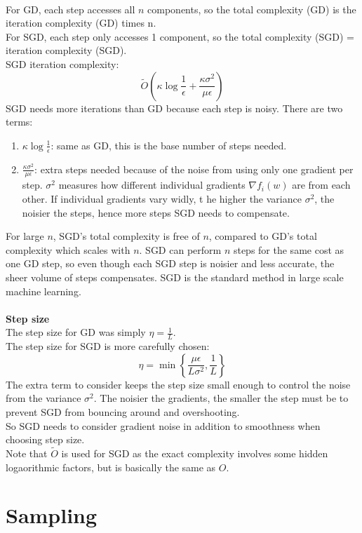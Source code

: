 \documentclass[../Probability.tex]{subfiles}
\begin{document}
\\
For GD, each step accesses all $n$ components, so the total complexity (GD) is the iteration complexity (GD) times n.\\
For SGD, each step only accesses 1 component, so the total complexity (SGD) = iteration complexity (SGD).\\
SGD iteration complexity:
$$\tilde{O}\left(\kappa\log\frac{1}{\epsilon} + \frac{\kappa\sigma^2}{\mu\epsilon}\right)$$
SGD needs more iterations than GD because each step is noisy. There are two terms:
\begin{enumerate}
    \item $\kappa \log \frac{1}{\epsilon}$: same as GD, this is the base number of steps needed.
    \item $\frac{\kappa \sigma^2}{\mu \epsilon}$: extra steps needed because of the noise from using only one gradient per step.
    $\sigma^2$ measures how different individual gradients $\nabla f_i(w)$ are from each other.
    If individual gradients vary widly, t   he higher the variance $\sigma^2$, the noisier the steps, hence more steps SGD needs to compensate.
\end{enumerate}
For large $n$, SGD's total complexity is free of $n$, compared to GD's total complexity which scales with $n$.
SGD can perform $n$ steps for the same cost as one GD step, so even though each SGD step is noisier and less accurate, the sheer volume of steps compensates.
SGD is the standard method in large scale machine learning.\\
\\
\textbf{Step size}\\
The step size for GD was simply $\eta = \frac{1}{L}$.\\
The step size for SGD is more carefully chosen:
$$\eta = \min\left\{\frac{\mu\epsilon}{L\sigma^2}, \frac{1}{L}\right\}$$
The extra term to consider keeps the step size small enough to control the noise from the variance $\sigma^2$. The noisier the gradients, the smaller the step must be to prevent SGD from bouncing around and overshooting.\\
So SGD needs to consider gradient noise in addition to smoothness when choosing step size.
\\
Note that $\tilde{O}$ is used for SGD as the exact complexity involves some hidden logaorithmic factors, but is basically the same as $O$.

\section{Sampling}
\end{document}

